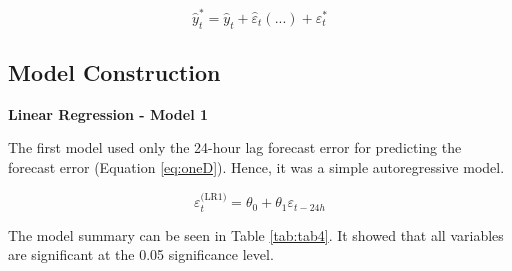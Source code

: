 \documentclass[mstat,12pt]{unswthesis}
\begin{document}
\begin{equation}
\hat{y}^{*}_{t} = \hat{y}_t + \hat{\varepsilon}_{t}(...) + \varepsilon^{*}_t \label{eq:oneC}
\end{equation}

\subsection{Model Construction}\label{model-construction}

\bigskip

\textbf{Linear Regression - Model 1}
\bigskip

\noindent The first model used only the 24-hour lag forecast error for predicting the forecast error (Equation \eqref{eq:oneD}). Hence, it was a simple autoregressive model.

\begin{equation}
\varepsilon^{\text{(LR1)}}_t = \theta_{0} + \theta_{1}\varepsilon_{t-24h} \label{eq:oneD}
\end{equation}

The model summary can be seen in Table \ref{tab:tab4}. It showed that all variables are significant at the 0.05 significance level.
\bigskip
\end{document}
